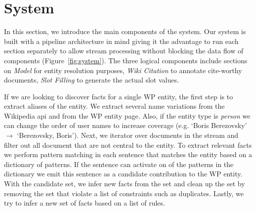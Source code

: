
\section{System}

In this section, we introduce the main components of the system. Our system is built with a pipeline architecture in mind giving it the advantage to run each section separately to allow stream processing without blocking the data flow of components (Figure~\ref{fig:system}). The three logical components include sections on \textit{Model} for entity resolution purposes, \textit{Wiki Citation} to annotate cite-worthy documents, \textit{Slot Filling} to generate the actual slot values.


If we are looking to discover facts for a single WP entity, the first step is to extract aliases of the entity.
We extract several name variations from the Wikipedia api and from the WP entity page.
Also, if the entity type is \textit{person} we can change the order of user names to increase coverage (e.g. `Boris Berezovsky' $\rightarrow$ `Berezovsky, Boris').
Next, we iterator over documents in the stream and filter out all document that are not central to the entity.
To extract relevant facts we perform pattern matching in each sentence that matches the entity based on a dictionary
of patterns.
If the sentence can activate on of the patterns in the dictionary we emit this sentence as a candidate contribution
to the WP entity.
With the candidate set, we infer new facts from the set and clean up the set
by removing the set that violate a list of constraints such as duplicates.
Lastly, we try to infer a new set of facts based on a list of rules.



